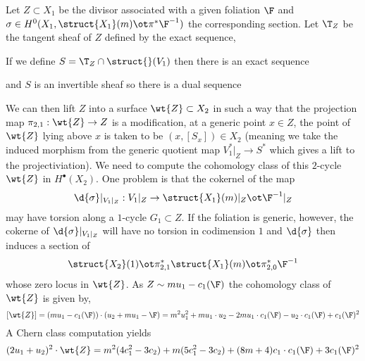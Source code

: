 \documentclass[12pt]{article}
\begin{document}
Let $Z \subset X_1$ be the divisor associated with a given foliation $\F$ and $\sigma \in H^0(X_1, \struct{X_1}(m) \ot \pi^* \F^{-1})$ the corresponding section. Let $\T_Z$ be the tangent sheaf of $Z$ defined by the exact sequence,
\begin{center}
\end{center}
If we define $S = \T_Z \cap \struct{}(V_1)$ then there is an exact sequence
\begin{center}
\end{center}
and $S$ is an invertible sheaf so there is a dual sequence
\begin{center}
\end{center}
We can then lift $Z$ into a surface $\wt{Z} \subset X_2$ in such a way that the projection map $\pi_{2,1} : \wt{Z} \to Z$ is a modification, at a generic point $x \in Z$, the point of $\wt{Z}$ lying above $x$ is taken to be $(x, [S_x]) \in X_2$ (meaning we take the induced morphism from the generic quotient map $V_1^*|_Z \to S^*$ which gives a lift to the projectiviation). We need to compute the cohomology class of this $2$-cycle $\wt{Z}$ in $H^\bullet(X_2)$. One problem is that the cokernel of the map
\[ \d{\sigma}|_{V_1|_Z} : V_1|_Z \to \struct{X_1}(m)|_Z \ot \F^{-1}|_Z \]
may have torsion along a $1$-cycle $G_1 \subset Z$. If the foliation is generic, however, the cokerne of $\d{\sigma}|_{V_1|_Z}$ will have no torsion in codimension $1$ and $\d{\sigma}$ then induces a section of
\[ \struct{X_2}(1) \ot \pi_{2,1}^* \struct{X_1}(m) \ot \pi^*_{2,0} \F^{-1} \]
whose zero locus in $\wt{Z}$. As $Z \sim m u_1 - c_1(\F)$ the cohomology class of $\wt{Z}$ is given by,
\[ [\wt{Z}] = (m u_1 - c_1(\F)) \cdot (u_2 + m u_1 - \F) = m^2 u_1^2 + m u_1 \cdot u_2 - 2 m u_1 \cdot c_1(\F) - u_2 \cdot c_1(\F) + c_1(\F)^2 \]
A Chern class computation yields
\[ (2 u_1 + u_2)^2 \cdot \wt{Z} = m^2 (4 c_1^2 - 3 c_2) + m (5 c_1^2 - 3 c_2) + (8 m + 4) c_1 \cdot c_1(\F) + 3 c_1(\F)^2 \]
\end{document}
